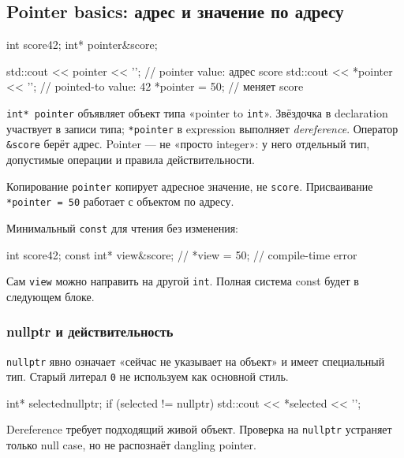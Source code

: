 \subsection{Pointer basics: адрес и значение по адресу}

\begin{cppcode}
int score{42};
int* pointer{&score};

std::cout << pointer << '\n';   // pointer value: адрес score
std::cout << *pointer << '\n';  // pointed-to value: 42
*pointer = 50;                  // меняет score
\end{cppcode}

\texttt{int* pointer} объявляет объект типа «pointer to \texttt{int}».
Звёздочка в declaration участвует в записи типа; \texttt{*pointer} в
expression выполняет \emph{dereference}. Оператор \texttt{\&score} берёт
адрес. Pointer --- не «просто integer»: у него отдельный тип, допустимые
операции и правила действительности.

\begin{whybox}
Копирование \texttt{pointer} копирует адресное значение, не \texttt{score}.
Присваивание \texttt{*pointer = 50} работает с объектом по адресу.
\end{whybox}

Минимальный \texttt{const} для чтения без изменения:

\begin{cppcode}
int score{42};
const int* view{&score};
// *view = 50; // compile-time error
\end{cppcode}

Сам \texttt{view} можно направить на другой \texttt{int}. Полная система
const будет в следующем блоке.

\subsubsection{nullptr и действительность}

\texttt{nullptr} явно означает «сейчас не указывает на объект» и имеет
специальный тип. Старый литерал \texttt{0} не используем как основной стиль.

\begin{cppcode}
int* selected{nullptr};
if (selected != nullptr) {
    std::cout << *selected << '\n';
}
\end{cppcode}

Dereference требует подходящий живой объект. Проверка на \texttt{nullptr}
устраняет только null case, но не распознаёт dangling pointer.

